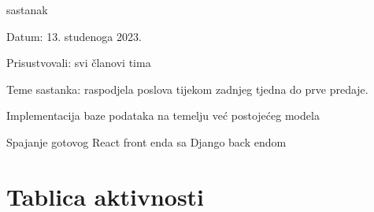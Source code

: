 \begin{packed_enum}
			\item  sastanak
			\item[] \begin{packed_item}
				\item Datum: 13. studenoga 2023.
				\item Prisustvovali: svi članovi tima
				\item Teme sastanka: raspodjela poslova tijekom zadnjeg tjedna do prve predaje.
				\begin{packed_item}
					\item  Implementacija baze podataka na temelju već postojećeg modela
					\item  Spajanje gotovog React front enda sa Django back endom
				\end{packed_item}
			\end{packed_item}
			
			
		\end{packed_enum}
		
		\eject
		\section*{Tablica aktivnosti}
		
			

